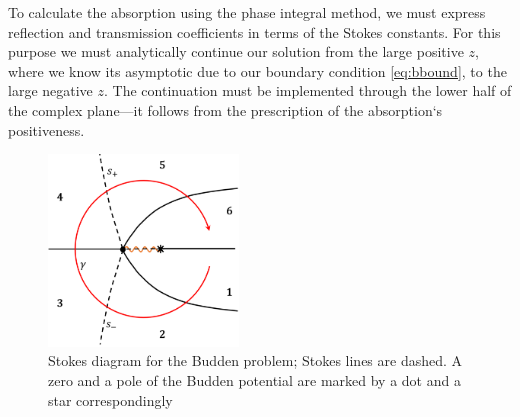 \documentclass[aip,jmp,reprint]{revtex4-1}
\def\mytextwidth{0.45\textwidth}
\begin{document}
To calculate the absorption using the phase integral method, we must express 
reflection and transmission coefficients in terms of the Stokes constants. 
For this purpose we must analytically continue our solution from the large positive $z$,
where we know its asymptotic due to our boundary condition \eqref{eq:bbound}, to
the large negative $z$. The continuation must be implemented through the lower half of the
complex plane---it follows from the prescription of the absorption`s positiveness\cite{rwbook}.

\begin{figure}
\centering
\noindent
\includegraphics[width=\mytextwidth]{sd.png}
\caption
{Stokes diagram for the Budden problem; Stokes lines are dashed.
A zero and a pole of the Budden potential are marked by a dot and a star correspondingly}
\label{fig:diagram}
\end{figure} 
\end{document}
